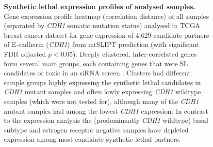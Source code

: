 \begin{figure}[!ht]
\begin{mdframed}
  \centering
    \caption[Synthetic lethal expression profiles of analysed samples]{\small \textbf{Synthetic lethal expression profiles of analysed samples.} Gene expression profile heatmap (correlation distance) of all samples (separated by \textit{CDH1} somatic mutation status) analysed in TCGA breast cancer dataset for gene expression of 4,629 candidate partners of E-cadherin (\textit{CDH1}) from mtSLIPT prediction (with significant FDR adjusted $p < 0.05$). Deeply clustered, inter-correlated genes form several main groups, each containing genes that were SL candidates or toxic in an siRNA screen \cite{Telford2015}. Clusters had different sample groups highly expressing the synthetic lethal candidates in \textit{CDH1} mutant samples and often lowly expressing \textit{CDH1} wildtype samples (which were not tested for), although many of the \textit{CDH1} mutant samples had among the lowest \textit{CDH1} expression. In contrast to the expression analysis the (predominantly \textit{CDH1} wildtype) basal subtype and estrogen receptor negative samples have depleted expression among most candidate synthetic lethal partners. 
}
\label{fig:slipt_expr_mtSL}
\end{mdframed}
\end{figure}

